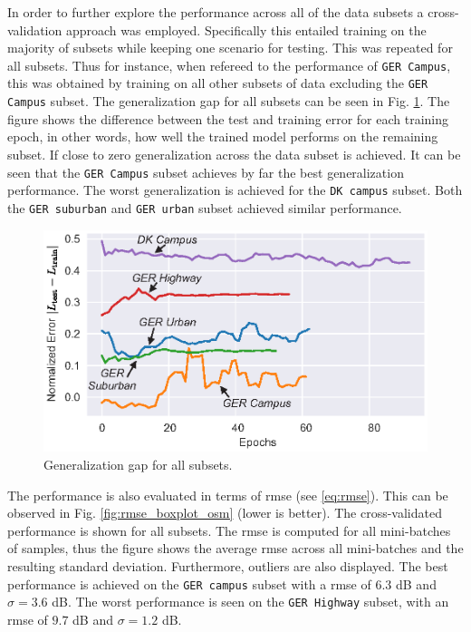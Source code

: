 In order to further explore the performance across all of the data subsets a cross-validation approach was employed. Specifically this entailed training on the majority of subsets while keeping one scenario for testing. This was repeated for all subsets. Thus for instance, when refereed to the performance of \texttt{GER Campus}, this was obtained by training on all other subsets of data excluding the \texttt{GER Campus} subset. The generalization gap for all subsets can be seen in Fig. \ref{fig:generalization_gap}. The figure shows the difference between the test and training error for each training epoch, in other words, how well the trained model performs on the remaining subset. If close to zero generalization across the data subset is achieved. It can be seen that the \texttt{GER Campus} subset achieves by far the best generalization performance. The worst generalization is achieved for the \texttt{DK campus} subset. Both the \texttt{GER suburban} and \texttt{GER urban} subset achieved similar performance.

\begin{figure}[h]
    \centering
    \includegraphics{chapters/part_pathloss/osm_images_paper/figures/training_test_error_crossvalidation_diff.eps}
    \caption{Generalization gap for all subsets.}
    \label{fig:generalization_gap}
\end{figure}

The performance is also evaluated in terms of \gls{rmse} (see \ref{eq:rmse}). This can be observed in Fig. \ref{fig:rmse_boxplot_osm} (lower is better). The cross-validated performance is shown for all subsets. The \gls{rmse} is computed for all mini-batches of samples, thus the figure shows the average \gls{rmse} across all mini-batches and the resulting standard deviation. Furthermore, outliers are also displayed. The best performance is achieved on the \texttt{GER campus} subset with a \gls{rmse} of $6.3$ dB and $\sigma = 3.6$ dB. The worst performance is seen on the \texttt{GER Highway} subset, with an \gls{rmse} of $9.7$ dB and $\sigma = 1.2$ dB.


